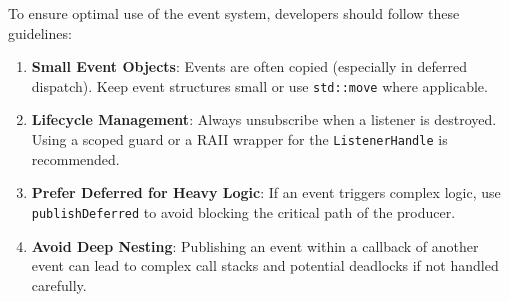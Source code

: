 To ensure optimal use of the event system, developers should follow these guidelines:

\begin{enumerate}
    \item \textbf{Small Event Objects}: Events are often copied (especially in deferred dispatch). Keep event structures small or use \texttt{std::move} where applicable.
    \item \textbf{Lifecycle Management}: Always unsubscribe when a listener is destroyed. Using a scoped guard or a RAII wrapper for the \texttt{ListenerHandle} is recommended.
    \item \textbf{Prefer Deferred for Heavy Logic}: If an event triggers complex logic, use \texttt{publishDeferred} to avoid blocking the critical path of the producer.
    \item \textbf{Avoid Deep Nesting}: Publishing an event within a callback of another event can lead to complex call stacks and potential deadlocks if not handled carefully.
\end{enumerate}
